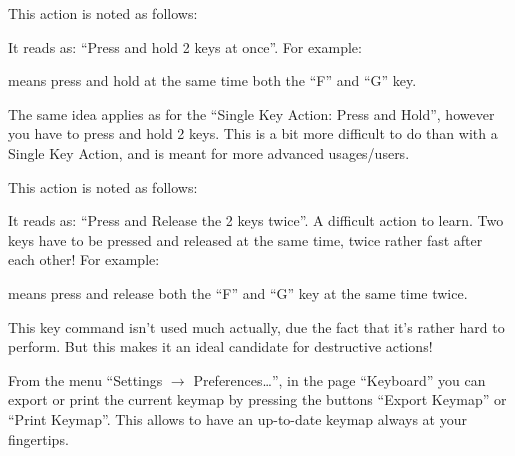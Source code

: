 This action is noted as follows:
\begin{quotation}
\end{quotation}
It reads as: ``Press and hold 2 keys at once''. For example:
\begin{quotation}
\end{quotation}
means press and hold at the same time both the ``F'' and ``G'' key.

The same idea applies as for the ``Single Key Action: Press and Hold'', however you have to press and hold 2 keys. This is a bit more difficult to do than with a Single Key Action, and is meant for more advanced usages/users.

 This action is noted as follows:
\begin{quotation}
\end{quotation}
It reads as: ``Press and Release the 2 keys twice''. A difficult action to learn. Two keys have to be pressed and released at the same time, twice rather fast after each other! For example:
\begin{quotation}
\end{quotation}
means press and release both the ``F'' and ``G'' key at the same time twice.

This key command isn't used much actually, due the fact that it's rather hard to perform. But this makes it an ideal candidate for destructive actions!

From the menu ``Settings $\rightarrow$ Preferences\dots'', in the page ``Keyboard'' you can export or print the current keymap by pressing the buttons ``Export Keymap'' or ``Print Keymap''. This allows to have an up-to-date keymap always at your fingertips.